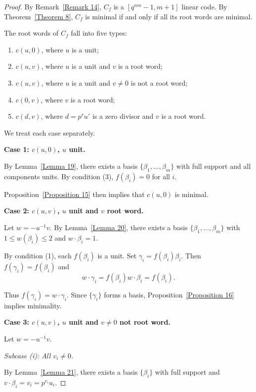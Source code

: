 \documentclass[10pt]{article}
\theoremstyle{definition}
\begin{document}
\begin{proof}

By Remark~\ref{Remark 14},
$C_f$ is a $[q^{nm}-1,m+1]$ linear code.
By Theorem~\ref{Theorem 8},
$C_f$ is minimal if and only if all its root words are minimal.

The root words of $C_f$ fall into five types:

\begin{enumerate}
\item $c(u,0)$, where $u$ is a unit;
\item $c(u,v)$, where $u$ is a unit and $v$ is a root word;
\item $c(u,v)$, where $u$ is a unit and $v\neq 0$ is not a root word;
\item $c(0,v)$, where $v$ is a root word;
\item $c(d,v)$, where $d=p^ru'$ is a zero divisor and $v$ is a root word.
\end{enumerate}

We treat each case separately.

\medskip
\noindent
\textbf{Case 1: $c(u,0)$, $u$ unit.}

By Lemma~\ref{Lemma 19},
there exists a basis
$\{\beta_1,\dots,\beta_m\}$
with full support and all components units.
By condition (3), $f(\beta_i)=0$ for all $i$.

Proposition~\ref{Proposition 15}
then implies that $c(u,0)$ is minimal.

\medskip
\noindent
\textbf{Case 2: $c(u,v)$, $u$ unit and $v$ root word.}

Let $w=-u^{-1}v$.
By Lemma~\ref{Lemma 20},
there exists a basis
$\{\beta_1,\dots,\beta_m\}$
with $1\leq w(\beta_i)\leq 2$ and $w\cdot\beta_i=1$.

By condition (1), each $f(\beta_i)$ is a unit.
Set $\gamma_i=f(\beta_i)\beta_i$.
Then $f(\gamma_i)=f(\beta_i)$ and
\[
w\cdot \gamma_i=f(\beta_i) w\cdot\beta_i=f(\beta_i).
\]

Thus $f(\gamma_i)=w\cdot \gamma_i$.
Since $\{\gamma_i\}$ forms a basis,
Proposition~\ref{Proposition 16}
implies minimality.

\medskip
\noindent
\textbf{Case 3: $c(u,v)$, $u$ unit and $v\neq 0$ not root word.}

Let $w=-u^{-1}v$.

\medskip
\noindent
\emph{Subcase (i): All $v_i\neq 0$.}

By Lemma~\ref{Lemma 21},
there exists a basis $\{\beta_i\}$
with full support and $v\cdot\beta_i=v_i=p^{r_i}u_i$.


\end{proof}
\end{document}
